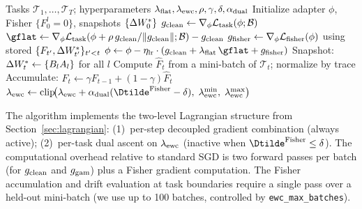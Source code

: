 \begin{algorithm}[H]
\caption{FS-LoRA Training}
\label{alg:fslora}
\begin{algorithmic}[1]
\Require Tasks $\mathcal{T}_1, \ldots, \mathcal{T}_T$; hyperparameters $\lambda_{\mathrm{flat}}, \lambda_{\mathrm{ewc}}, \rho, \gamma, \delta, \alpha_{\mathrm{dual}}$
\State Initialize adapter $\phi$, Fisher $\{F_0^l = 0\}$, snapshots $\{\Delta W^*_0\}$
    \State $g_{\mathrm{clean}} \leftarrow \nabla_\phi \mathcal{L}_{\mathrm{task}}(\phi; \mathcal{B})$ 
    \State $\gflat \leftarrow \nabla_\phi \Ltask(\phi + \rho\,\gclean/\|\gclean\|; \mathcal{B}) - \gclean$ 
    \State $g_{\mathrm{fisher}} \leftarrow \nabla_\phi \mathcal{L}_{\mathrm{fisher}}(\phi)$ using stored $\{F_{t'}, \Delta W^*_{t'}\}_{t'<t}$
    \State $\phi \leftarrow \phi - \eta_{\mathrm{lr}} \cdot (\gclean + \lambdaflat\,\gflat + \gfisher)$
  \EndFor
  \State Snapshot: $\Delta W^*_t \leftarrow \{B_l A_l\}$ for all $l$
  \State Compute $\hat{F}_t$ from a mini-batch of $\mathcal{T}_t$; normalize by trace
  \State Accumulate: $F_t \leftarrow \gamma F_{t-1} + (1-\gamma)\hat{F}_t$
   
    \State $\lambdaewc \leftarrow \mathrm{clip}\!\bigl(\lambdaewc + \alpha_{\mathrm{dual}}(\Dtilde^{\mathrm{Fisher}} - \delta),\;\lambdaewc^{\min},\;\lambdaewc^{\max}\bigr)$
  \EndIf
\EndFor
\end{algorithmic}
\end{algorithm}

The algorithm implements the two-level Lagrangian structure from
Section~\ref{sec:lagrangian}: (1)~per-step decoupled gradient combination
(always active); (2)~per-task dual ascent on $\lambda_{\mathrm{ewc}}$
(inactive when $\Dtilde^{\mathrm{Fisher}}\leq\delta$).
The computational overhead relative to standard SGD is two forward passes per batch
(for $g_{\mathrm{clean}}$ and $g_{\mathrm{gam}}$) plus a Fisher gradient computation.
The Fisher accumulation and drift evaluation at task boundaries require a single pass
over a held-out mini-batch (we use up to 100 batches, controlled by
\texttt{ewc\_max\_batches}).
